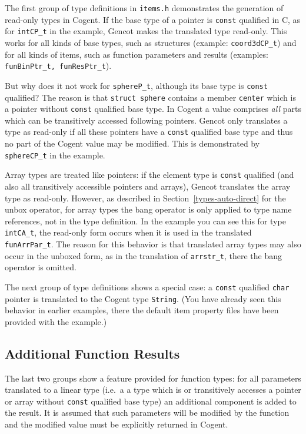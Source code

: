 \documentclass[a4paper]{report}
\newcommand{\code}[1]{\textnormal{\texttt{#1}}}
\begin{document}
The first group of type definitions in \code{items.h} demonstrates the generation of read-only types in Cogent.
If the base type of a pointer is \code{const} qualified in C, as for \code{intCP\_t} in the example, Gencot makes
the translated type read-only. This works for all kinds of base types, such as structures (example: \code{coord3dCP\_t})
and for all kinds of items, such as function parameters and results (examples: \code{funBinPtr\_t, funResPtr\_t}).

But why does it not work for \code{sphereP\_t}, although its base type is \code{const} qualified? The reason is that 
\code{struct sphere} contains a member \code{center} which is a pointer without \code{const} qualified base
type. In Cogent a value comprises \textit{all} parts which can be transitively accessed following pointers. Gencot
only translates a type as read-only if all these pointers have a \code{const} qualified base type and thus no part 
of the Cogent value may be modified. This is demonstrated by \code{sphereCP\_t} in the example.

Array types are treated like pointers: if the element type is \code{const} qualified (and also all transitively 
accessible pointers and arrays), Gencot translates the array type as read-only. However, as described in 
Section~\ref{types-auto-direct} for the unbox operator, for array types the bang operator is only applied to type 
name references, not in the type definition. In the example you can see this for type \code{intCA\_t}, the read-only
form occurs when it is used in the translated \code{funArrPar\_t}. The reason for this behavior is that translated 
array types may also occur in the unboxed form, as in the translation of \code{arrstr\_t}, there the bang operator
is omitted.

The next group of type definitions shows a special case: a \code{const} qualified \code{char} pointer is translated 
to the Cogent type \code{String}. (You have already seen this behavior in earlier examples, there the default item 
property files have been provided with the example.)

\subsection{Additional Function Results}
\label{types-dfltprops-addresult}

The last two groups show a feature provided for function types: for all parameters translated to a linear type (i.e.~a
a type which is or transitively accesses a pointer or array without \code{const} qualified base type) an additional
component is added to the result. It is assumed that such parameters will be modified by the function and the modified
value must be explicitly returned in Cogent.
\end{document}
